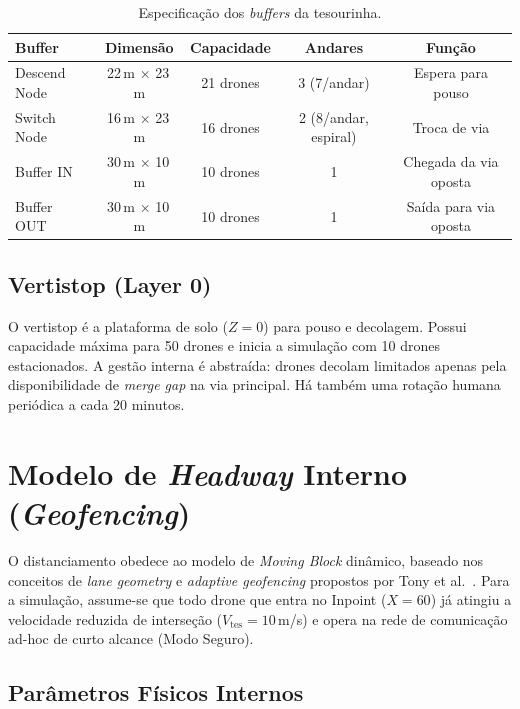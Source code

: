 \documentclass[12pt,a4paper]{article}
\newcommand{\vtes}{V_{\text{tes}}}
\begin{document}
\begin{table}[H]
\centering
\caption{Especificação dos \textit{buffers} da tesourinha.}
\label{tab:buffers}
\begin{tabular}{@{}lcccc@{}}
\toprule
\textbf{Buffer} & \textbf{Dimensão} & \textbf{Capacidade} & \textbf{Andares} & \textbf{Função} \\
\midrule
Descend Node    & 22\,m $\times$ 23\,m & 21 drones & 3 (7/andar)           & Espera para pouso \\
Switch Node     & 16\,m $\times$ 23\,m & 16 drones & 2 (8/andar, espiral)  & Troca de via \\
Buffer IN       & 30\,m $\times$ 10\,m & 10 drones & 1                     & Chegada da via oposta \\
Buffer OUT      & 30\,m $\times$ 10\,m & 10 drones & 1                     & Saída para via oposta \\
\bottomrule
\end{tabular}
\end{table}

\subsection{Vertistop (Layer 0)}

O vertistop é a plataforma de solo ($Z = 0$) para pouso e decolagem. Possui capacidade máxima para 50 drones e inicia a simulação com 10 drones estacionados. A gestão interna é abstraída: drones decolam limitados apenas pela disponibilidade de \textit{merge gap} na via principal. Há também uma rotação humana periódica a cada 20 minutos.

\section{Modelo de \textit{Headway} Interno (\textit{Geofencing})}
\label{sec:headway}

O distanciamento obedece ao modelo de \textit{Moving Block} dinâmico, baseado nos conceitos de \textit{lane geometry} e \textit{adaptive geofencing} propostos por Tony et al.~\cite{tony2021lane}. Para a simulação, assume-se que todo drone que entra no Inpoint ($X=60$) já atingiu a velocidade reduzida de interseção ($\vtes = 10$\,m/s) e opera na rede de comunicação ad-hoc de curto alcance (Modo Seguro).

\subsection{Parâmetros Físicos Internos}
\end{document}
